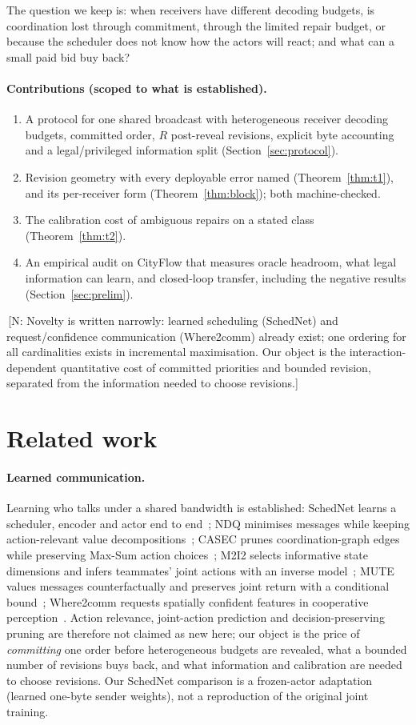 \documentclass[11pt]{article}
\theoremstyle{definition}
\newif\ifshownotes\shownotestrue
\newcommand{\NOTE}[1]{\ifshownotes{\color{notecol}\,\textsf{\footnotesize[N: #1]}}\fi}
\begin{document}
The question we keep is: when receivers have different decoding budgets, is coordination lost
through commitment, through the limited repair budget, or because the scheduler does not know
how the actors will react; and what can a small paid bid buy back?

\paragraph{Contributions (scoped to what is established).}
\begin{enumerate}
\item A protocol for one shared broadcast with heterogeneous receiver decoding budgets, committed
  order, $R$ post-reveal revisions, explicit byte accounting and a legal/privileged information
  split (Section~\ref{sec:protocol}).
\item Revision geometry with every deployable error named (Theorem~\ref{thm:t1}), and its
  per-receiver form (Theorem~\ref{thm:block}); both machine-checked.
\item The calibration cost of ambiguous repairs on a stated class (Theorem~\ref{thm:t2}).
\item An empirical audit on CityFlow that measures oracle headroom, what legal information can
  learn, and closed-loop transfer, including the negative results (Section~\ref{sec:prelim}).
\end{enumerate}
\NOTE{Novelty is written narrowly: learned scheduling (SchedNet) and request/confidence
communication (Where2comm) already exist; one ordering for all cardinalities exists in
incremental maximisation. Our object is the interaction-dependent quantitative cost of committed
priorities and bounded revision, separated from the information needed to choose revisions.}

\section{Related work}
\paragraph{Learned communication.} Learning who talks under a shared bandwidth is established:
SchedNet learns a scheduler, encoder and actor end to end~\cite{schednet}; NDQ minimises messages
while keeping action-relevant value decompositions~\cite{ndq}; CASEC prunes coordination-graph edges
while preserving Max-Sum action choices~\cite{casec}; M2I2 selects informative state dimensions and
infers teammates' joint actions with an inverse model~\cite{m2i2}; MUTE values messages
counterfactually and preserves joint return with a conditional bound~\cite{mute}; Where2comm
requests spatially confident features in cooperative perception~\cite{where2comm}. Action relevance,
joint-action prediction and decision-preserving pruning are therefore not claimed as new here; our
object is the price of \emph{committing} one order before heterogeneous budgets are revealed, what
a bounded number of revisions buys back, and what information and calibration are needed to choose
revisions. Our SchedNet comparison is a frozen-actor adaptation (learned one-byte sender weights),
not a reproduction of the original joint training.
\end{document}
